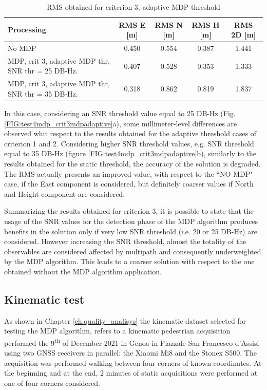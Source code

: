 \begin{table}[H]
	\centering
	\begin{tabular}{|p{4.5cm}|c|c|c|c|}
	\hline
	\textbf{Processing} & \textbf{RMS E [m]} & \textbf{RMS N [m]} &
	\textbf{RMS H [m]}&
	\textbf{RMS 2D [m]}\\
    \hline
	No MDP & 0.450 & 0.554& 0.387&1.441\\  
    \hline
	 MDP, crit 3, adaptive MDP thr, SNR thr = 25 DB-Hz.& 0.407 & 0.528& 0.353&1.333\\ \hline
	 MDP, crit 3, adaptive MDP thr, SNR thr = 35 DB-Hz.& 0.318 & 0.862&0.819& 1.837\\ \hline
	\end{tabular} 
	\caption{RMS obtained for criterion 3, adaptive MDP threshold}
	\label{tab:mdp_crit3_mdp_table_adaptive}
\end{table}
In this case, considering an SNR threshold value equal to 25 DB-Hz (Fig. \ref{FIG:test4mdp_crit3mdpadaptive}a), some millimeter-level differences are observed whit respect to the results obtained for the adaptive threshold cases of criterion 1 and 2. Considering higher SNR threshold values, e.g. SNR threshold equal to 35 DB-Hz (figure \ref{FIG:test4mdp_crit3mdpadaptive}b), similarly to the results obtained for the static threshold, the accuracy of the solution is degraded. The RMS actually presents an improved value, with respect to the ``NO MDP" case, if the East component is considered, but definitely coarser values if North and Height component are considered. 

Summarizing the results obtained for criterion 3, it is possible to state that the usage of the SNR values for the detection phase of the MDP algorithm produces benefits in the solution only if very low SNR threshold (i.e. 20 or 25 DB-Hz) are considered. However increasing the SNR threshold, almost the totality of the observables are considered affected by multipath and consequently underweighted by the MDP algorithm. This leads to a coarser solution with respect to the one obtained without the MDP algorithm application.

\subsection{Kinematic test}

As shown in Chapter \ref{ch:quality_analisys} the kinematic dataset selected for testing the MDP algorithm, refers to a kinematic pedestrian acquisition performed the 9\textsuperscript{th} of December 2021 in Genoa in Piazzale San Francesco d'Assisi using two GNSS receivers in parallel: the Xiaomi Mi8 and the Stonex S500. The acquisition was performed walking between four corners of known coordinates. At the beginning and at the end, 2 minutes of static acquisitions were performed at one of four corners considered.

